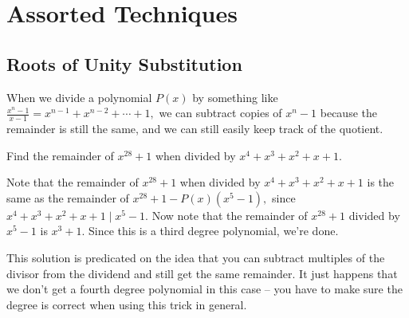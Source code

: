\documentclass[mast]{lucky}
\begin{document}
%
%

\section{Assorted Techniques}

\subsection{Roots of Unity Substitution}
When we divide a polynomial $P(x)$ by something like $\frac{x^n-1}{x-1}=x^{n-1}+x^{n-2}+\cdots+1,$ we can subtract copies of $x^n-1$ because the remainder is still the same, and we can still easily keep track of the quotient.

\begin{exam}
Find the remainder of $x^{28}+1$ when divided by $x^4+x^3+x^2+x+1.$
\end{exam}

\begin{sol}
Note that the remainder of $x^{28}+1$ when divided by $x^4+x^3+x^2+x+1$ is the same as the remainder of $x^{28}+1-P(x)(x^5-1),$ since $x^4+x^3+x^2+x+1\mid x^5-1.$ Now note that the remainder of $x^{28}+1$ divided by $x^5-1$ is $x^3+1.$ Since this is a third degree polynomial, we're done.
\end{sol}
This solution is predicated on the idea that you can subtract multiples of the divisor from the dividend and still get the same remainder. It just happens that we don't get a fourth degree polynomial in this case -- you have to make sure the degree is correct when using this trick in general.
\end{document}
